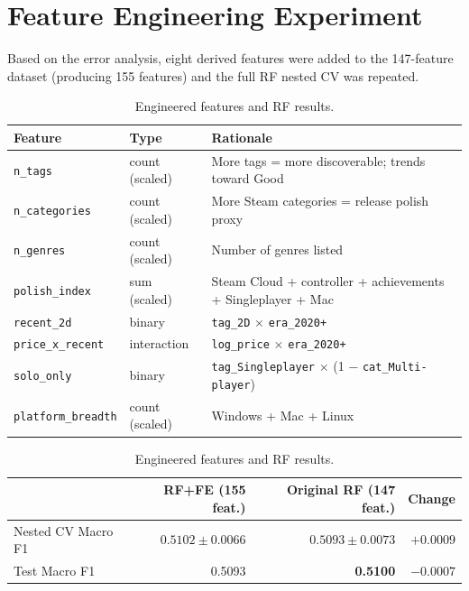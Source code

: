 \documentclass[11pt, a4paper]{article}
\newcommand{\ttf}[1]{\texttt{#1}}
\begin{document}
\section{Feature Engineering Experiment}
\label{sec:fe}

Based on the error analysis, eight derived features were added to the 147-feature dataset
(producing 155 features) and the full RF nested CV was repeated.

\begin{table}[H]
  \centering\small
  \caption{Engineered features and RF results.}
  \label{tab:fe}
  \begin{tabularx}{\linewidth}{llX}
    \toprule
    \textbf{Feature} & \textbf{Type} & \textbf{Rationale} \\
    \midrule
    \ttf{n\_tags}           & count (scaled) & More tags = more discoverable; trends toward Good \\
    \ttf{n\_categories}     & count (scaled) & More Steam categories = release polish proxy \\
    \ttf{n\_genres}         & count (scaled) & Number of genres listed \\
    \ttf{polish\_index}     & sum (scaled)   & Steam Cloud + controller + achievements + Singleplayer + Mac \\
    \ttf{recent\_2d}        & binary         & \ttf{tag\_2D} $\times$ \ttf{era\_2020+} \\
    \ttf{price\_x\_recent}  & interaction    & \ttf{log\_price} $\times$ \ttf{era\_2020+} \\
    \ttf{solo\_only}        & binary         & \ttf{tag\_Singleplayer} $\times$ (1 $-$ \ttf{cat\_Multi-player}) \\
    \ttf{platform\_breadth} & count (scaled) & Windows + Mac + Linux \\
    \bottomrule
  \end{tabularx}
  \vspace{4pt}
  \begin{tabular}{lrrr}
    \toprule
    & \textbf{RF+FE (155 feat.)} & \textbf{Original RF (147 feat.)} & \textbf{Change} \\
    \midrule
    Nested CV Macro F1 & $0.5102 \pm 0.0066$ & $0.5093 \pm 0.0073$ & $+0.0009$ \\
    Test Macro F1      & 0.5093              & \textbf{0.5100}     & $-0.0007$ \\
    \bottomrule
  \end{tabular}
\end{table}
\end{document}
